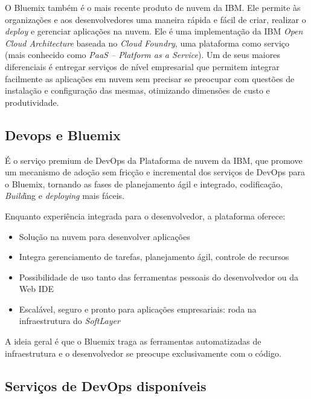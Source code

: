 O Bluemix também é o mais recente produto de nuvem da IBM. Ele permite às organizações e aos desenvolvedores uma maneira rápida e fácil de criar, realizar o \textit{deploy} e gerenciar aplicações na nuvem. Ele é uma implementação da IBM \textit{Open Cloud Architecture} baseada no \textit{Cloud Foundry}, uma plataforma como serviço (mais conhecido como \textit{PaaS – Platform as a Service}). Um de seus maiores diferenciais é entregar serviços de nível empresarial que permitem integrar facilmente as aplicações em nuvem sem precisar se preocupar com questões de instalação e configuração das mesmas, otimizando dimensões de custo e produtividade.

\subsection{Devops e Bluemix}
É o serviço premium de DevOps da Plataforma de nuvem da IBM, que promove um mecanismo de adoção sem fricção e incremental dos serviços de DevOps para o Bluemix, tornando as fases de planejamento ágil e integrado, codificação, \textit{Build}ing e \textit{deploying} mais fáceis.

Enquanto experiência integrada para o desenvolvedor, a plataforma oferece:
\begin{itemize}
    \item Solução na nuvem para desenvolver aplicações
    \item Integra gerenciamento de tarefas, planejamento ágil, controle de recursos
    \item Possibilidade de uso tanto das ferramentas pessoais do desenvolvedor ou da Web IDE
    \item Escalável, seguro e pronto para aplicações empresariais: roda na infraestrutura do \textit{SoftLayer}
\end{itemize}

A ideia geral é que o Bluemix traga as ferramentas automatizadas de infraestrutura e o desenvolvedor se preocupe exclusivamente com o código.

\subsection{Serviços de DevOps disponíveis}

